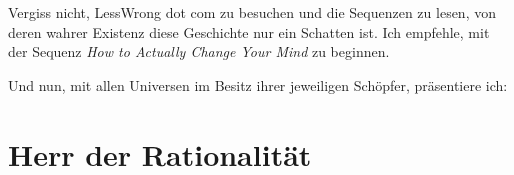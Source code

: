 \begin{chapterOpeningAuthorNote}
Vergiss nicht, LessWrong dot com zu besuchen und die Sequenzen zu lesen, von deren wahrer Existenz diese Geschichte nur ein Schatten ist. Ich empfehle, mit der Sequenz \emph{How to Actually Change Your Mind} zu beginnen.

Und nun, mit allen Universen im Besitz ihrer jeweiligen Schöpfer, präsentiere ich:
\end{chapterOpeningAuthorNote}


\section{Herr der Rationalität}

